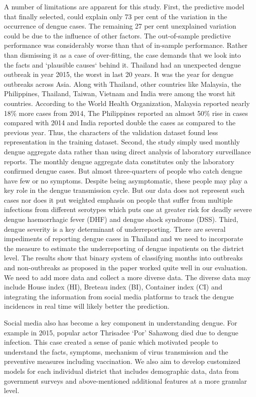 \documentclass{bmcart}
\begin{document}
A number of limitations are apparent for this study.  First, the predictive model that finally selected, could explain only 73 per cent of the variation in the occurrence of dengue cases. The remaining 27 per cent unexplained variation could be due to the influence of other factors. The out-of-sample predictive performance was considerably worse than that of in-sample performance. Rather than dismissing it as a case of over-fitting, the case demands that we look into the facts and `plausible causes` behind it. Thailand had an unexpected dengue outbreak in year 2015, the worst in last 20 years. It was the year for dengue outbreaks across Asia. Along with Thailand, other countries like Malaysia, the Philippines, Thailand, Taiwan, Vietnam and India were among the worst hit countries. According to the World Health Organization, Malaysia reported nearly 18\% more cases from 2014, The Philippines reported an almost 50\% rise in cases compared with 2014 and India reported double the cases as compared to the previous year. Thus, the characters of the validation dataset found less representation in the training dataset. Second, the study simply used monthly dengue aggregate data rather than using direct analysis of laboratory surveillance reports. The monthly dengue aggregate data constitutes only the laboratory confirmed dengue cases. But almost three-quarters of people who catch dengue have few or no symptoms. Despite being asymptomatic, these people may play a key role in the dengue transmission cycle. But our data does not represent such cases nor does it put weighted emphasis on people that suffer from multiple infections from different serotypes which puts one at greater risk for deadly severe dengue haemorrhagic fever (DHF) and dengue shock syndrome (DSS).  Third, dengue severity is a key determinant of underreporting. There are several impediments of reporting dengue cases in Thailand and we need to incorporate the measure to estimate the underreporting of dengue inpatients on the district level. The results show that binary system of classifying months into outbreaks and non-outbreaks as proposed in the paper worked quite well in our evaluation. We need to add more data and collect a more diverse data. The diverse data may include House index (HI), Breteau index (BI), Container index (CI) and integrating the information from social media platforms to track the dengue incidences in real time will likely better the prediction.
	
Social media also has become a key component in understanding dengue. For example in 2015, popular actor Thrisadee `Por' Sahawong died due to dengue infection. This case created a sense of panic which motivated people to understand the facts, symptoms, mechanism of virus transmission  and the preventive measures including vaccination.	
We also aim to develop customized models for each individual district that includes demographic data, data from government surveys and above-mentioned additional features at a more granular level. 
\end{document}
